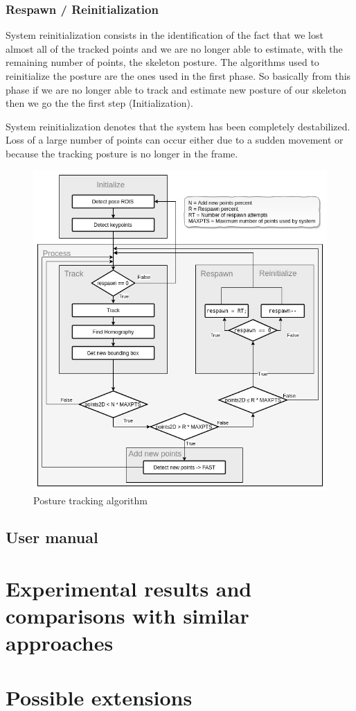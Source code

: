 \subsubsection{Respawn / Reinitialization}
\par System reinitialization consists in the identification of the fact that we lost almost all of the tracked points and we are no longer able to estimate, with the remaining number of points, the skeleton posture. The algorithms used to reinitialize the posture are the ones used in the first phase. So basically from this phase if we are no longer able to track and estimate new posture of our skeleton then we go the the first step (Initialization).

\par System reinitialization denotes that the system has been completely destabilized. Loss of a large number of points can occur either due to a sudden movement or because the tracking posture is no longer in the frame.

\begin{figure}
	\centerline{\includegraphics[scale=0.5]{fig/posture-tracking-algorithm.jpg}}  
	\caption{Posture tracking algorithm}
\end{figure}
\subsection{User manual}

\section{Experimental results and comparisons with similar approaches}

\section{Possible extensions}